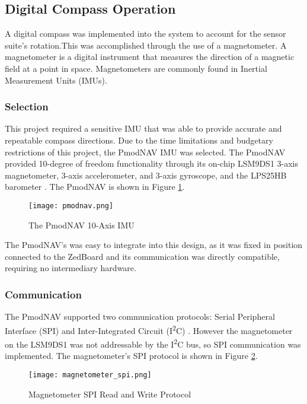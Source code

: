 \subsection{Digital Compass Operation}
A digital compass was implemented into the system to account for the sensor suite's rotation.This was accomplished through the use of a magnetometer. A magnetometer is a digital instrument that measures the direction of a magnetic field at a point in space. Magnetometers are commonly found in Inertial Measurement Units (IMUs).

\subsubsection{Selection}
This project required a sensitive IMU that was able to provide accurate and repeatable compass directions. Due to the time limitations and budgetary restrictions of this project, the PmodNAV IMU was selected. The PmodNAV provided 10-degree of freedom functionality through its on-chip LSM9DS1 3-axis magnetometer, 3-axis accelerometer, and 3-axis gyroscope, and the LPS25HB barometer \cite{lsm9ds1, lps25hd}. The PmodNAV is shown in Figure \ref{pmodnav}.

\begin{figure}[H]
	\centerline{\texttt{[image: pmodnav.png]}}
	\caption{The PmodNAV 10-Axis IMU \cite{pmodnav_ref}}
	\label{pmodnav}
\end{figure}

The PmodNAV's was easy to integrate into this design, as it was fixed in position connected to the ZedBoard and its communication was directly compatible, requiring no intermediary hardware.

\subsubsection{Communication}
The PmodNAV supported two communication protocols: Serial Peripheral Interface (SPI) and Inter-Integrated Circuit (I\textsuperscript{2}C) \cite{lsm9ds1}. However the magnetometer on the LSM9DS1 was not addressable by the I\textsuperscript{2}C bus, so SPI communication was implemented. The magnetometer's SPI protocol is shown in Figure \ref{magnetometer_spi}.

\begin{figure}[H]
	\centerline{\texttt{[image: magnetometer\_spi.png]}}
	\caption{Magnetometer SPI Read and Write Protocol \cite{lsm9ds1}}
	\label{magnetometer_spi}
\end{figure}

